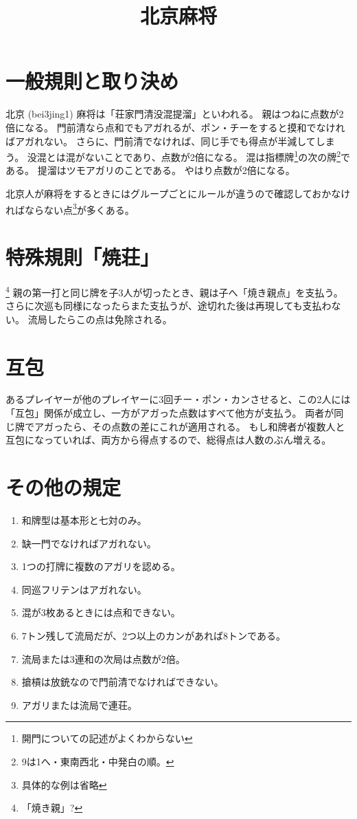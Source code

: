 \documentclass{ltjsarticle}
\title{北京麻将}
\begin{document}
\maketitle
\section{一般規則と取り決め}
北京 (bei3jing1) 麻将は「荘家門清没混提溜」といわれる。
親はつねに点数が2倍になる。
門前清なら点和でもアガれるが、ポン・チーをすると摸和でなければアガれない。
さらに、門前清でなければ、同じ手でも得点が半減してしまう。
没混とは混がないことであり、点数が2倍になる。
混は指標牌\footnote{開門についての記述がよくわからない}の次の牌\footnote{9は1へ・東南西北・中発白の順。}である。
提溜はツモアガリのことである。
やはり点数が2倍になる。

北京人が麻将をするときにはグループごとにルールが違うので確認しておかなければならない点\footnote{具体的な例は省略}が多くある。
\section{特殊規則「焼荘」}
\footnote{「焼き親」?}
親の第一打と同じ牌を子3人が切ったとき、親は子へ「焼き親点」を支払う。
さらに次巡も同様になったらまた支払うが、途切れた後は再現しても支払わない。
流局したらこの点は免除される。
\section{互包}
あるプレイヤーが他のプレイヤーに3回チー・ポン・カンさせると、この2人には「互包」関係が成立し、一方がアガった点数はすべて他方が支払う。
両者が同じ牌でアガったら、その点数の差にこれが適用される。
もし和牌者が複数人と互包になっていれば、両方から得点するので、総得点は人数のぶん増える。
\section{その他の規定}
\begin{enumerate}
    \item 和牌型は基本形と七対のみ。
    \item 缺一門でなければアガれない。
    \item 1つの打牌に複数のアガリを認める。
    \item 同巡フリテンはアガれない。
    \item 混が3枚あるときには点和できない。
    \item 7トン残して流局だが、2つ以上のカンがあれば8トンである。
    \item 流局または3連和の次局は点数が2倍。
    \item 搶槓は放銃なので門前清でなければできない。
    \item アガリまたは流局で連荘。
\end{enumerate}
\end{document}
